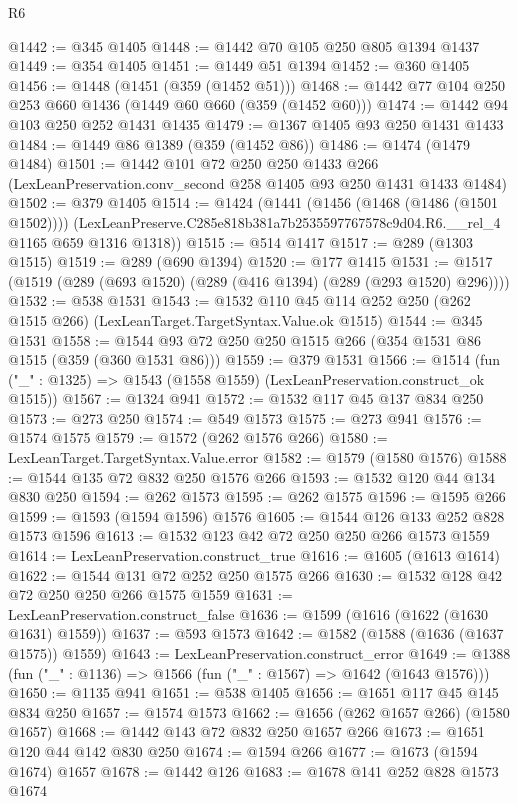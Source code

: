 \begin{lexlean}{R6}
\begin{coremodule}
@1442 := @345 @1405
@1448 := @1442 @70 @105 @250 @805 @1394 @1437
@1449 := @354 @1405
@1451 := @1449 @51 @1394
@1452 := @360 @1405
@1456 := @1448 (@1451 (@359 (@1452 @51)))
@1468 := @1442 @77 @104 @250 @253 @660 @1436 (@1449 @60 @660 (@359 (@1452 @60)))
@1474 := @1442 @94 @103 @250 @252 @1431 @1435
@1479 := @1367 @1405 @93 @250 @1431 @1433
@1484 := @1449 @86 @1389 (@359 (@1452 @86))
@1486 := @1474 (@1479 @1484)
@1501 := @1442
    @101
    @72
    @250
    @250
    @1433
    @266
    (LexLeanPreservation.conv_second @258 @1405 @93 @250 @1431 @1433 @1484)
@1502 := @379 @1405
@1514 := @1424
    (@1441
      (@1456 (@1468 (@1486 (@1501 @1502))))
      (LexLeanPreserve.C285e818b381a7b2535597767578c9d04.R6.__rel_4 @1165 @659 @1316 @1318))
@1515 := @514 @1417
@1517 := @289 (@1303 @1515)
@1519 := @289 (@690 @1394)
@1520 := @177 @1415
@1531 := @1517 (@1519 (@289 (@693 @1520) (@289 (@416 @1394) (@289 (@293 @1520) @296))))
@1532 := @538 @1531
@1543 := @1532 @110 @45 @114 @252 @250 (@262 @1515 @266) (LexLeanTarget.TargetSyntax.Value.ok @1515)
@1544 := @345 @1531
@1558 := @1544 @93 @72 @250 @250 @1515 @266 (@354 @1531 @86 @1515 (@359 (@360 @1531 @86)))
@1559 := @379 @1531
@1566 := @1514 (fun ("_" : @1325) => @1543 (@1558 @1559) (LexLeanPreservation.construct_ok @1515))
@1567 := @1324 @941
@1572 := @1532 @117 @45 @137 @834 @250
@1573 := @273 @250
@1574 := @549 @1573
@1575 := @273 @941
@1576 := @1574 @1575
@1579 := @1572 (@262 @1576 @266)
@1580 := LexLeanTarget.TargetSyntax.Value.error
@1582 := @1579 (@1580 @1576)
@1588 := @1544 @135 @72 @832 @250 @1576 @266
@1593 := @1532 @120 @44 @134 @830 @250
@1594 := @262 @1573
@1595 := @262 @1575
@1596 := @1595 @266
@1599 := @1593 (@1594 @1596) @1576
@1605 := @1544 @126 @133 @252 @828 @1573 @1596
@1613 := @1532 @123 @42 @72 @250 @250 @266 @1573 @1559
@1614 := LexLeanPreservation.construct_true
@1616 := @1605 (@1613 @1614)
@1622 := @1544 @131 @72 @252 @250 @1575 @266
@1630 := @1532 @128 @42 @72 @250 @250 @266 @1575 @1559
@1631 := LexLeanPreservation.construct_false
@1636 := @1599 (@1616 (@1622 (@1630 @1631) @1559))
@1637 := @593 @1573
@1642 := @1582 (@1588 (@1636 (@1637 @1575)) @1559)
@1643 := LexLeanPreservation.construct_error
@1649 := @1388 (fun ("_" : @1136) => @1566 (fun ("_" : @1567) => @1642 (@1643 @1576)))
@1650 := @1135 @941
@1651 := @538 @1405
@1656 := @1651 @117 @45 @145 @834 @250
@1657 := @1574 @1573
@1662 := @1656 (@262 @1657 @266) (@1580 @1657)
@1668 := @1442 @143 @72 @832 @250 @1657 @266
@1673 := @1651 @120 @44 @142 @830 @250
@1674 := @1594 @266
@1677 := @1673 (@1594 @1674) @1657
@1678 := @1442 @126
@1683 := @1678 @141 @252 @828 @1573 @1674

\end{coremodule}
\end{lexlean}
